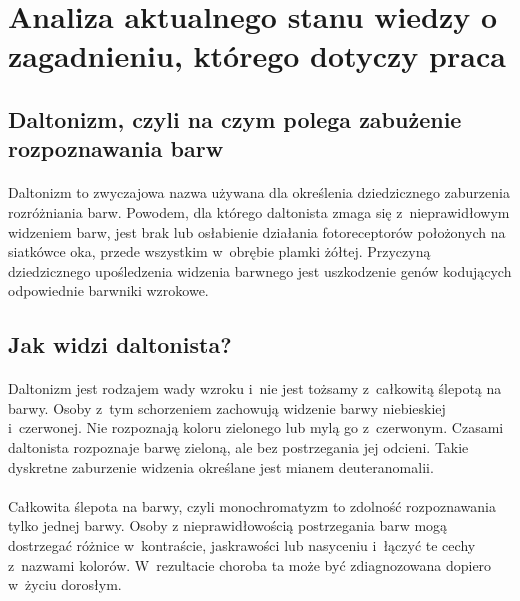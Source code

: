 \documentclass[12pt, letterpaper]{article}
\begin{document}
\newpage
\section{Analiza aktualnego stanu wiedzy o zagadnieniu, którego dotyczy praca}
\subsection{Daltonizm, czyli na czym polega zabużenie rozpoznawania barw}
\paragraph{}
Daltonizm to zwyczajowa nazwa używana dla określenia dziedzicznego zaburzenia rozróżniania barw. Powodem, dla którego daltonista zmaga się z~nieprawidłowym widzeniem barw, jest brak lub osłabienie działania fotoreceptorów położonych na siatkówce oka, przede wszystkim w~obrębie plamki żółtej. Przyczyną dziedzicznego upośledzenia widzenia barwnego jest uszkodzenie genów kodujących odpowiednie barwniki wzrokowe.

\subsection{Jak widzi daltonista?}

\paragraph{}
Daltonizm jest rodzajem wady wzroku i~nie jest tożsamy z~całkowitą ślepotą na barwy. Osoby z~tym schorzeniem zachowują widzenie barwy niebieskiej i~czerwonej. Nie rozpoznają koloru zielonego lub mylą go z~czerwonym. Czasami daltonista rozpoznaje barwę zieloną, ale bez postrzegania jej odcieni. Takie dyskretne zaburzenie widzenia określane jest mianem deuteranomalii.

\paragraph{}
Całkowita ślepota na barwy, czyli monochromatyzm to zdolność rozpoznawania tylko jednej barwy. Osoby z nieprawidłowością postrzegania barw mogą dostrzegać różnice w~kontraście, jaskrawości lub nasyceniu i~łączyć te cechy z~nazwami kolorów. W~rezultacie choroba ta może być zdiagnozowana dopiero w~życiu dorosłym. 
\end{document}
